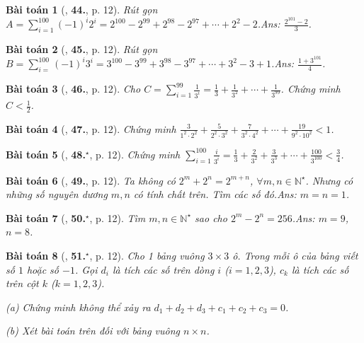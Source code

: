 \documentclass{article}
\numberwithin{equation}{section}
\newtheorem{baitoan}{Bài toán}
\begin{document}
\begin{baitoan}[\cite{Binh_Toan_7_tap_1}, \textbf{44.}, p. 12]
	Rút gọn $A = \sum_{i=1}^{100} (-1)^i2^i = 2^{100} - 2^{99} + 2^{98} - 2^{97} + \cdots + 2^2 - 2$.\hfill\textsf{Ans:} $\frac{2^{101} - 2}{3}$.
\end{baitoan}

\begin{baitoan}[\cite{Binh_Toan_7_tap_1}, \textbf{45.}, p. 12]
	Rút gọn $B = \sum_{i=
	}^{100} (-1)^i3^i = 3^{100} - 3^{99} + 3^{98} - 3^{97} + \cdots + 3^2 - 3 + 1$.\hfill\textsf{Ans:} $\frac{1 + 3^{101}}{4}$.
\end{baitoan}

\begin{baitoan}[\cite{Binh_Toan_7_tap_1}, \textbf{46.}, p. 12]
	Cho $C = \sum_{i=1}^{99} \frac{1}{3^i} = \frac{1}{3} + \frac{1}{3^2} + \cdots + \frac{1}{3^{99}}$. Chứng minh $C < \frac{1}{2}$.
\end{baitoan}

\begin{baitoan}[\cite{Binh_Toan_7_tap_1}, \textbf{47.}, p. 12]
	Chứng minh $\frac{3}{1^2\cdot 2^2} + \frac{5}{2^2\cdot 3^2} + \frac{7}{3^2\cdot 4^2} + \cdots + \frac{19}{9^2\cdot 10^2} < 1$.
\end{baitoan}

\begin{baitoan}[\cite{Binh_Toan_7_tap_1}, \textbf{48.}${}^\star$, p. 12]
	Chứng minh $\sum_{i=1}^{100} \frac{i}{3^i} = \frac{1}{3} + \frac{2}{3^2} + \frac{3}{3^3} + \cdots + \frac{100}{3^{100}} < \frac{3}{4}$.
\end{baitoan}

\begin{baitoan}[\cite{Binh_Toan_7_tap_1}, \textbf{49.}, p. 12]
	Ta không có $2^m + 2^n = 2^{m+n}$, $\forall m,n\in\mathbb{N}^\star$. Nhưng có những số nguyên dương $m,n$ có tính chất trên. Tìm các số đó.\hfill\textsf{Ans:} $m = n = 1$.
\end{baitoan}

\begin{baitoan}[\cite{Binh_Toan_7_tap_1}, \textbf{50.}${}^\star$, p. 12]
	Tìm $m,n\in\mathbb{N}^\star$ sao cho $2^m - 2^n = 256$.\hfill\textsf{Ans:} $m = 9$, $n = 8$.
\end{baitoan}

\begin{baitoan}[\cite{Binh_Toan_7_tap_1}, \textbf{51.}${}^\star$, p. 12]
	Cho 1 bảng vuông $3\times 3$ ô. Trong mỗi ô của bảng viết số $1$ hoặc số $-1$. Gọi $d_i$ là tích các số trên dòng $i$ ($i = 1,2,3$), $c_k$ là tích các số trên cột $k$ ($k = 1,2,3$).
	\begin{enumerate*}
		\item[(a)] Chứng minh không thể xảy ra $d_1 + d_2 + d_3 + c_1 + c_2 + c_3 = 0$.
		\item[(b)] Xét bài toán trên đối với bảng vuông $n\times n$.
	\end{enumerate*}
\end{baitoan}
\end{document}
